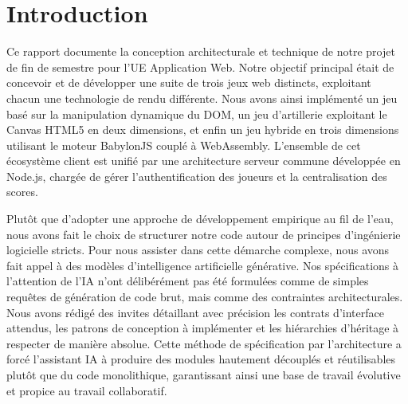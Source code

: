 \section{Introduction}

Ce rapport documente la conception architecturale et technique de notre projet de fin de semestre pour l'UE Application Web. Notre objectif principal était de concevoir et de développer une suite de trois jeux web distincts, exploitant chacun une technologie de rendu différente. Nous avons ainsi implémenté un jeu basé sur la manipulation dynamique du DOM, un jeu d'artillerie exploitant le Canvas HTML5 en deux dimensions, et enfin un jeu hybride en trois dimensions utilisant le moteur BabylonJS couplé à WebAssembly. L'ensemble de cet écosystème client est unifié par une architecture serveur commune développée en Node.js, chargée de gérer l'authentification des joueurs et la centralisation des scores.

Plutôt que d'adopter une approche de développement empirique au fil de l'eau, nous avons fait le choix de structurer notre code autour de principes d'ingénierie logicielle stricts. Pour nous assister dans cette démarche complexe, nous avons fait appel à des modèles d'intelligence artificielle générative. Nos spécifications à l'attention de l'IA n'ont délibérément pas été formulées comme de simples requêtes de génération de code brut, mais comme des contraintes architecturales. Nous avons rédigé des invites détaillant avec précision les contrats d'interface attendus, les patrons de conception à implémenter et les hiérarchies d'héritage à respecter de manière absolue. Cette méthode de spécification par l'architecture a forcé l'assistant IA à produire des modules hautement découplés et réutilisables plutôt que du code monolithique, garantissant ainsi une base de travail évolutive et propice au travail collaboratif.